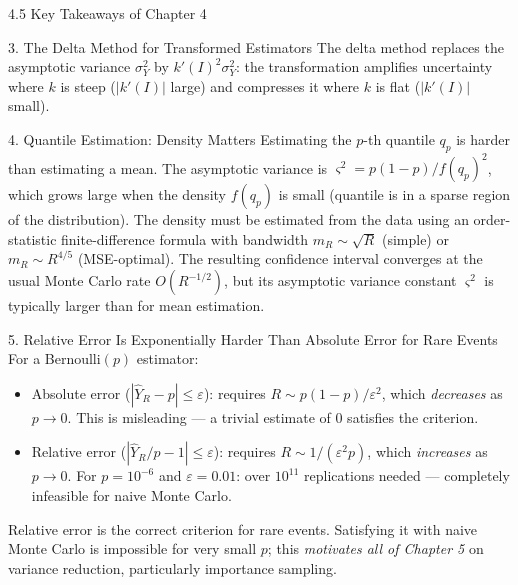 \documentclass[aspectratio=169,10pt]{beamer}
\begin{document}
\begin{frame}[allowframebreaks]{4.5 Key Takeaways of Chapter 4}
\begin{alertblock}{3. The Delta Method for Transformed Estimators}
  The delta method replaces the asymptotic variance $\sigma_Y^2$ by
  $k'(I)^2 \sigma_Y^2$: the transformation amplifies uncertainty where $k$ is
  steep ($|k'(I)|$ large) and compresses it where $k$ is flat ($|k'(I)|$ small).
\end{alertblock}

\begin{alertblock}{4. Quantile Estimation: Density Matters}
  Estimating the $p$-th quantile $q_p$ is harder than estimating a mean.
  The asymptotic variance is $\varsigma^2 = p(1-p)/f(q_p)^2$, which grows
  large when the density $f(q_p)$ is small (quantile is in a sparse region
  of the distribution).  The density must be estimated from the data using an
  order-statistic finite-difference formula with bandwidth $m_R \sim \sqrt{R}$
  (simple) or $m_R \sim R^{4/5}$ (MSE-optimal).  The resulting confidence
  interval converges at the usual Monte Carlo rate $O(R^{-1/2})$, but its
  asymptotic variance constant $\varsigma^2$ is typically larger than for mean
  estimation.
\end{alertblock}

\framebreak

\begin{alertblock}{5. Relative Error Is Exponentially Harder Than Absolute Error for Rare Events}
  For a Bernoulli$(p)$ estimator:
  \begin{itemize}
    \item Absolute error ($|\hat{Y}_R - p| \leq \varepsilon$): requires
      $R \sim p(1-p)/\varepsilon^2$, which \emph{decreases} as $p \to 0$.
      This is misleading --- a trivial estimate of 0 satisfies the criterion.
    \item Relative error ($|\hat{Y}_R/p - 1| \leq \varepsilon$): requires
      $R \sim 1/(\varepsilon^2 p)$, which \emph{increases} as $p \to 0$.
      For $p = 10^{-6}$ and $\varepsilon = 0.01$: over $10^{11}$ replications
      needed --- completely infeasible for naive Monte Carlo.
  \end{itemize}
  Relative error is the correct criterion for rare events.  Satisfying it with
  naive Monte Carlo is impossible for very small $p$; this \emph{motivates all
  of Chapter 5} on variance reduction, particularly importance sampling.
\end{alertblock}


\end{frame}
\end{document}
